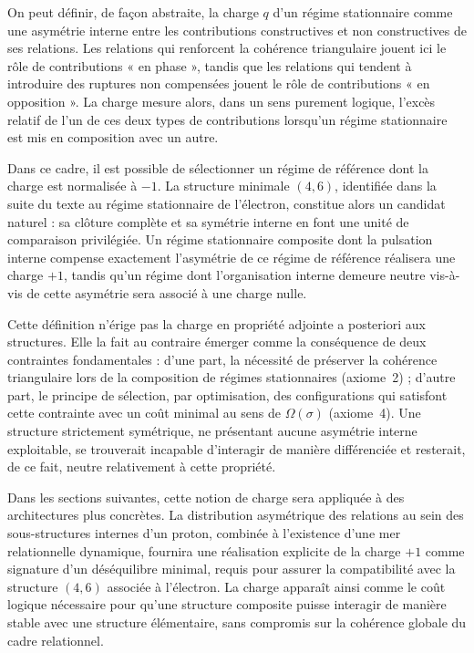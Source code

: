 \documentclass[11pt,a4paper]{article}
\begin{document}
On peut définir, de façon abstraite, la charge \(q\) d’un régime stationnaire comme une asymétrie interne entre les contributions constructives et non constructives de ses relations. Les relations qui renforcent la cohérence triangulaire jouent ici le rôle de contributions « en phase », tandis que les relations qui tendent à introduire des ruptures non compensées jouent le rôle de contributions « en opposition ». La charge mesure alors, dans un sens purement logique, l’excès relatif de l’un de ces deux types de contributions lorsqu’un régime stationnaire est mis en composition avec un autre.

Dans ce cadre, il est possible de sélectionner un régime de référence dont la charge est normalisée à \(-1\). La structure minimale \(\left(4,6\right)\), identifiée dans la suite du texte au régime stationnaire de l’électron, constitue alors un candidat naturel : sa clôture complète et sa symétrie interne en font une unité de comparaison privilégiée. Un régime stationnaire composite dont la pulsation interne compense exactement l’asymétrie de ce régime de référence réalisera une charge \(+1\), tandis qu’un régime dont l’organisation interne demeure neutre vis-à-vis de cette asymétrie sera associé à une charge nulle.

Cette définition n’érige pas la charge en propriété adjointe a posteriori aux structures. Elle la fait au contraire émerger comme la conséquence de deux contraintes fondamentales : d’une part, la nécessité de préserver la cohérence triangulaire lors de la composition de régimes stationnaires (axiome~2) ; d’autre part, le principe de sélection, par optimisation, des configurations qui satisfont cette contrainte avec un coût minimal au sens de \(\Omega\left(\sigma\right)\) (axiome~4). Une structure strictement symétrique, ne présentant aucune asymétrie interne exploitable, se trouverait incapable d’interagir de manière différenciée et resterait, de ce fait, neutre relativement à cette propriété.

Dans les sections suivantes, cette notion de charge sera appliquée à des architectures plus concrètes. La distribution asymétrique des relations au sein des sous-structures internes d’un proton, combinée à l’existence d’une mer relationnelle dynamique, fournira une réalisation explicite de la charge \(+1\) comme signature d’un déséquilibre minimal, requis pour assurer la compatibilité avec la structure \(\left(4,6\right)\) associée à l’électron. La charge apparaît ainsi comme le coût logique nécessaire pour qu’une structure composite puisse interagir de manière stable avec une structure élémentaire, sans compromis sur la cohérence globale du cadre relationnel.
\end{document}
